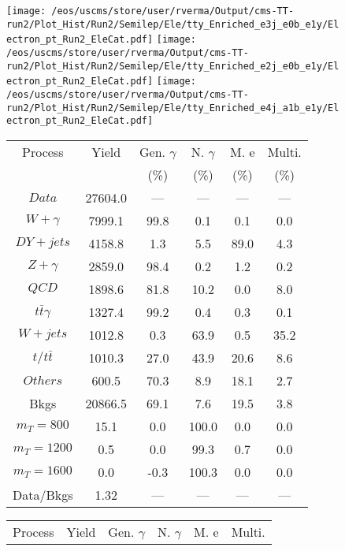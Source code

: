 \begin{figure}
\centering
\texttt{[image: /eos/uscms/store/user/rverma/Output/cms-TT-run2/Plot\_Hist/Run2/Semilep/Ele/tty\_Enriched\_e3j\_e0b\_e1y/Electron\_pt\_Run2\_EleCat.pdf]}
\texttt{[image: /eos/uscms/store/user/rverma/Output/cms-TT-run2/Plot\_Hist/Run2/Semilep/Ele/tty\_Enriched\_e2j\_e0b\_e1y/Electron\_pt\_Run2\_EleCat.pdf]}
\texttt{[image: /eos/uscms/store/user/rverma/Output/cms-TT-run2/Plot\_Hist/Run2/Semilep/Ele/tty\_Enriched\_e4j\_a1b\_e1y/Electron\_pt\_Run2\_EleCat.pdf]}
\begin{minipage}[c]{0.32\textwidth}
\centering
\tiny{
\begin{tabular}{cccccc}
\hline
Process & Yield & Gen. $\gamma$ & N. $\gamma$ & M. e & Multi. \\
 &  & (\%) & (\%) & (\%) & (\%)  \\
\hline
                                                                      $ Data $ &  27604.0 &  --- &  --- &  --- &  ---\\
$ W+\gamma $ &  7999.1 &  99.8 &  0.1 &  0.1 &  0.0\\
$ DY+jets $ &  4158.8 &  1.3 &  5.5 &  89.0 &  4.3\\
$ Z+\gamma $ &  2859.0 &  98.4 &  0.2 &  1.2 &  0.2\\
$ QCD $ &  1898.6 &  81.8 &  10.2 &  0.0 &  8.0\\
$ t\bar{t}\gamma $ &  1327.4 &  99.2 &  0.4 &  0.3 &  0.1\\
$ W+jets $ &  1012.8 &  0.3 &  63.9 &  0.5 &  35.2\\
$ t/t\bar{t} $ &  1010.3 &  27.0 &  43.9 &  20.6 &  8.6\\
$ Others $ &  600.5 &  70.3 &  8.9 &  18.1 &  2.7\\
Bkgs &  20866.5 &  69.1 &  7.6 &  19.5 &  3.8\\
$ m_{T} = 800 $ &  15.1 &  0.0 &  100.0 &  0.0 &  0.0\\
$ m_{T} = 1200 $ &  0.5 &  0.0 &  99.3 &  0.7 &  0.0\\
$ m_{T} = 1600 $ &  0.0 &  -0.3 &  100.3 &  0.0 &  0.0\\
Data/Bkgs &  1.32 &  --- &  --- &  --- &  ---\\
\hline
\end{tabular}
}
\end{minipage}
\begin{minipage}[c]{0.32\textwidth}
\centering
\tiny{
\begin{tabular}{cccccc}
\hline
Process & Yield & Gen. $\gamma$ & N. $\gamma$ & M. e & Multi. \\

\end{tabular}}
\end{minipage}
\end{figure}
